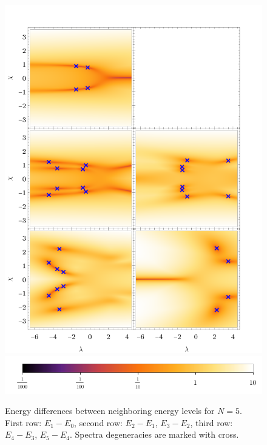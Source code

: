 \begin{figure}[H]
    \centering
    \includegraphics[scale=1.3]{../img/singularitiesBetweenEnergiesN=5.pdf}
    \includegraphics[scale=1.3]{../img/N=5_bar6.pdf}
    \caption{Energy differences between neighboring energy levels for $N=5$. First row: $E_1-E_0$, second row: $E_2-E_1$, $E_3-E_2$, third row: $E_4-E_3$, $E_5-E_4$. Spectra degeneracies are marked with  cross.}
    \label{fig:singularitiesBetweenEnergiesN=5}    
\end{figure}

